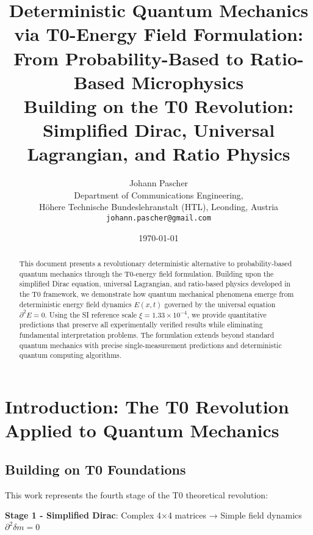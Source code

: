 \documentclass[12pt,a4paper]{article}
\newcommand{\Efield}{E}
\newcommand{\xipar}{\xi}
\begin{document}
	
	\title{Deterministic Quantum Mechanics via T0-Energy Field Formulation: \\
		From Probability-Based to Ratio-Based Microphysics \\
		\large Building on the T0 Revolution: Simplified Dirac, Universal Lagrangian, and Ratio Physics}
	\author{Johann Pascher\\
		Department of Communications Engineering, \\H{\"o}here Technische Bundeslehranstalt (HTL), Leonding, Austria\\
		\texttt{johann.pascher@gmail.com}}
	\date{\today}
	
	\maketitle
	
	\begin{abstract}
		This document presents a revolutionary deterministic alternative to probability-based quantum mechanics through the T0-energy field formulation. Building upon the simplified Dirac equation, universal Lagrangian, and ratio-based physics developed in the T0 framework, we demonstrate how quantum mechanical phenomena emerge from deterministic energy field dynamics $\Efield(x,t)$ governed by the universal equation $\partial^2 \Efield = 0$. Using the SI reference scale $\xipar = 1.33 \times 10^{-4}$, we provide quantitative predictions that preserve all experimentally verified results while eliminating fundamental interpretation problems. The formulation extends beyond standard quantum mechanics with precise single-measurement predictions and deterministic quantum computing algorithms.
	\end{abstract}
	
	\tableofcontents
	\newpage
	
	\section{Introduction: The T0 Revolution Applied to Quantum Mechanics}
	
	\subsection{Building on T0 Foundations}
	
	This work represents the fourth stage of the T0 theoretical revolution:
	
	\textbf{Stage 1 - Simplified Dirac}: Complex 4×4 matrices → Simple field dynamics $\partial^2 \delta m = 0$
	
\end{document}
